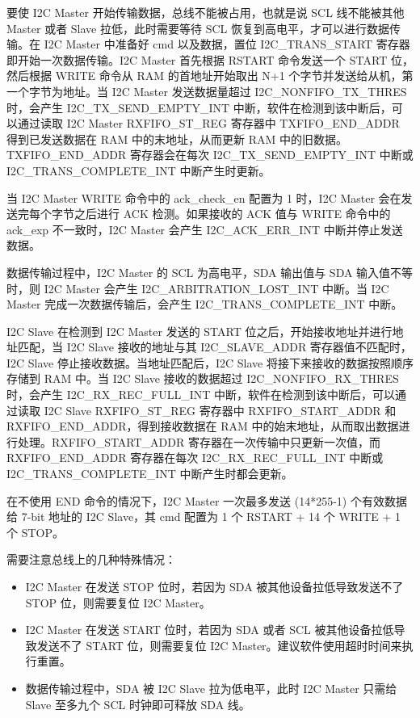 \documentclass[main\_\_CN.tex]{subfiles}
\begin{document}
要使 I2C Master 开始传输数据，总线不能被占用，也就是说 SCL 线不能被其他 Master 或者 Slave 拉低，此时需要等待 SCL 恢复到高电平，才可以进行数据传输。在 I2C Master 中准备好 cmd 以及数据，置位 I2C\_TRANS\_START 寄存器即开始一次数据传输。I2C Master 首先根据 RSTART 命令发送一个 START 位，然后根据 WRITE 命令从 RAM 的首地址开始取出 N+1 个字节并发送给从机，第一个字节为地址。当 I2C Master 发送数据量超过 I2C\_NONFIFO\_TX\_THRES 时，会产生 I2C\_TX\_SEND\_EMPTY\_INT 中断，软件在检测到该中断后，可以通过读取 I2C Master RXFIFO\_ST\_REG 寄存器中 TXFIFO\_END\_ADDR 得到已发送数据在 RAM 中的末地址，从而更新 RAM 中的旧数据。TXFIFO\_END\_ADDR 寄存器会在每次 I2C\_TX\_SEND\_EMPTY\_INT 中断或 I2C\_TRANS\_COMPLETE\_INT 中断产生时更新。

当 I2C Master WRITE 命令中的 ack\_check\_en 配置为 1 时，I2C Master 会在发送完每个字节之后进行 ACK 检测。如果接收的 ACK 值与 WRITE 命令中的 ack\_exp 不一致时，I2C Master 会产生 I2C\_ACK\_ERR\_INT 中断并停止发送数据。

数据传输过程中，I2C Master 的 SCL 为高电平，SDA 输出值与 SDA 输入值不等时，则 I2C Master 会产生 I2C\_ARBITRATION\_LOST\_INT 中断。当 I2C Master 完成一次数据传输后，会产生 I2C\_TRANS\_COMPLETE\_INT 中断。

I2C Slave 在检测到 I2C Master 发送的 START 位之后，开始接收地址并进行地址匹配，当 I2C Slave 接收的地址与其 I2C\_SLAVE\_ADDR 寄存器值不匹配时，I2C Slave 停止接收数据。当地址匹配后，I2C Slave 将接下来接收的数据按照顺序存储到 RAM 中。当 I2C Slave 接收的数据超过 I2C\_NONFIFO\_RX\_THRES 时，会产生 I2C\_RX\_REC\_FULL\_INT 中断，软件在检测到该中断后，可以通过读取 I2C Slave RXFIFO\_ST\_REG 寄存器中 RXFIFO\_START\_ADDR 和 RXFIFO\_END\_ADDR，得到接收数据在 RAM 中的始末地址，从而取出数据进行处理。RXFIFO\_START\_ADDR 寄存器在一次传输中只更新一次值，而 RXFIFO\_END\_ADDR 寄存器在每次 I2C\_RX\_REC\_FULL\_INT 中断或 I2C\_TRANS\_COMPLETE\_INT 中断产生时都会更新。

在不使用 END 命令的情况下，I2C Master 一次最多发送 (14*255-1) 个有效数据给 7-bit 地址的 I2C Slave，其 cmd 配置为 1 个 RSTART + 14 个 WRITE + 1 个 STOP。


需要注意总线上的几种特殊情况：
\begin{itemize}
    \item I2C Master 在发送 STOP 位时，若因为 SDA 被其他设备拉低导致发送不了 STOP 位，则需要复位 I2C Master。
    \item I2C Master 在发送 START 位时，若因为 SDA 或者 SCL 被其他设备拉低导致发送不了 START 位，则需要复位 I2C Master。建议软件使用超时时间来执行重置。
    \item 数据传输过程中，SDA 被 I2C Slave 拉为低电平，此时 I2C Master 只需给 Slave 至多九个 SCL 时钟即可释放 SDA 线。
\end{itemize}
\end{document}
